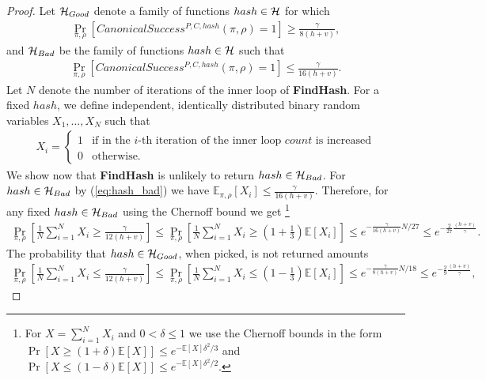 \begin{proof}
Let $\mathcal{H}_{Good}$ denote a family of functions $hash \in \mathcal{H}$ for which
\begin{align}
  \label{eq:hash_good}
\underset{\pi, \rho}{\Pr}\left[CanonicalSuccess^{P, C, hash}(\pi, \rho) = 1\right] \geq \frac{\gamma}{8(h+v)},
\end{align}
and $\mathcal{H}_{Bad}$ be the family of functions $hash \in \mathcal{H}$ such that
\begin{align}
  \label{eq:hash_bad}
\underset{\pi, \rho}{\Pr}\left[CanonicalSuccess^{P, C, hash}(\pi, \rho) = 1\right] \leq \frac{\gamma}{16(h+v)}.
\end{align}
%
Let $N$ denote the number of iterations of the inner loop of \textbf{FindHash}.
For a fixed $hash$, we define independent, identically distributed binary random variables $X_1, \dots, X_{N}$ such that
\begin{align*}
  X_i =
  \begin{cases}
    1 & \text{if in the $i$-th iteration of the inner loop $count$ is increased}\\
    0 & \text{otherwise.}
  \end{cases}
\end{align*}
We show now that \textbf{FindHash} is unlikely to return $hash \in \mathcal{H}_{Bad}$.
For $hash \in \mathcal{H}_{Bad}$ by (\ref{eq:hash_bad}) we have $\mathbb{E}_{{\pi}, \rho}[X_i] \leq \frac{\gamma}{16(h+v)}$.
Therefore, for any fixed $hash \in \mathcal{H}_{Bad}$ using the Chernoff bound we get
\footnote{For $X = \sum_{i=1}^N X_i$ and $0 < \delta \leq 1$ we use the Chernoff bounds in the form
$\Pr[X \geq (1+\delta) \mathbb{E}[X]] \leq e^{- \mathbb{E}[X] \delta^2/3}$ and
$\Pr[X \leq (1-\delta) \mathbb{E}[X]] \leq e^{- \mathbb{E}[X] \delta^2/2}$.}
\begin{align*}
  \underset{\pi,\rho}{\Pr} \left[\frac{1}{N} \sum_{i=1}^{N} X_i \geq \frac{\gamma}{12(h+v)} \right] \leq
  \underset{\pi, \rho}{\Pr}\left[\frac{1}{N} \sum_{i=1}^{N} X_i \geq (1 + \frac{1}{3}) \mathbb{E}[X_i]\right] \leq
  e^{-{\frac{\gamma}{16(h+v)}} N / 27} \leq e^{-\frac{2}{27}\frac{(h+v)}{\gamma}}.
\end{align*}
%
The probability that $hash \in \mathcal{H}_{Good}$, when picked, is not returned amounts
\begin{align*}
  \underset{\pi, \rho}{\Pr}\left[\frac{1}{N} \sum_{i=1}^{N} X_i \leq \frac{\gamma}{12(h+v)}\right] \leq
  \underset{\pi, \rho}{\Pr}\left[\frac{1}{N} \sum_{i=1}^{N} X_i \leq (1 - \frac{1}{3})\mathbb{E}[X_i]\right]
  \leq e^{-{\frac{\gamma}{8(h+v)}} N / 18} \leq e^{-\frac{2}{9} \frac{(h+v)}{\gamma}},
\end{align*}

\end{proof}

